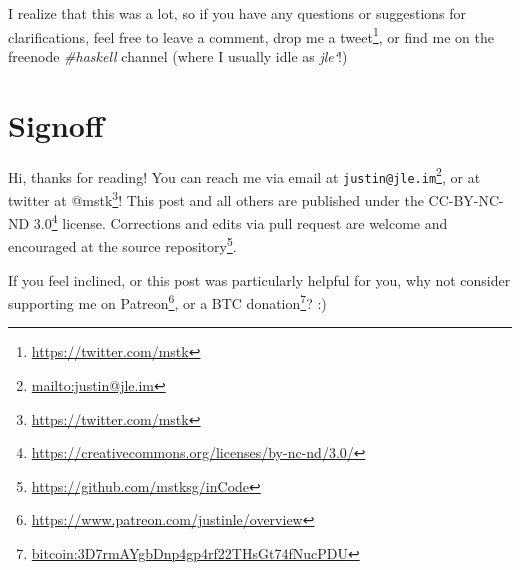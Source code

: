 \documentclass[]{article}
\renewcommand{\href}[2]{#2\footnote{\url{#1}}}
\begin{document}
I realize that this was a lot, so if you have any questions or suggestions for
clarifications, feel free to leave a comment, drop me a
\href{https://twitter.com/mstk}{tweet}, or find me on the freenode
\emph{\#haskell} channel (where I usually idle as \emph{jle`}!)

\hypertarget{signoff}{%
\section{Signoff}\label{signoff}}

Hi, thanks for reading! You can reach me via email at
\href{mailto:justin@jle.im}{\nolinkurl{justin@jle.im}}, or at twitter at
\href{https://twitter.com/mstk}{@mstk}! This post and all others are published
under the \href{https://creativecommons.org/licenses/by-nc-nd/3.0/}{CC-BY-NC-ND
3.0} license. Corrections and edits via pull request are welcome and encouraged
at \href{https://github.com/mstksg/inCode}{the source repository}.

If you feel inclined, or this post was particularly helpful for you, why not
consider \href{https://www.patreon.com/justinle/overview}{supporting me on
Patreon}, or a \href{bitcoin:3D7rmAYgbDnp4gp4rf22THsGt74fNucPDU}{BTC donation}?
:)
\end{document}
